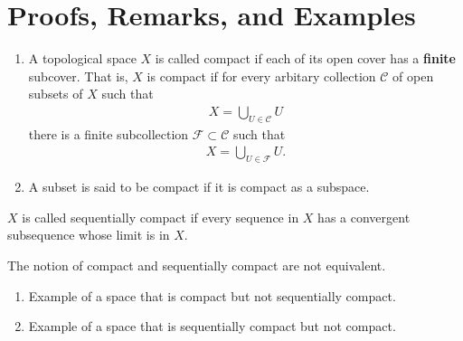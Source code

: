 \section{Proofs, Remarks, and Examples}

\begin{defbox}
    \begin{definition}
        \begin{enumerate}
            \item A topological space \(X\) is called {\color{maththen}compact} if each of its {\color{mathif}open cover} has a \textbf{finite} {\color{mathif}subcover}. That is, \(X\) is compact if for every arbitary collection \(\mathcal{C}\) of open subsets of \(X\) such that
            \begin{align*}
                X = \bigcup_{U \in \mathcal{C}} U
            \end{align*}
            there is a finite subcollection \(\mathcal{F} \subset \mathcal{C}\) such that
            \begin{align*}
                X = \bigcup_{U \in \mathcal{F}} U \text{.}
            \end{align*}
            \item A subset is said to be compact if it is compact as a subspace.
        \end{enumerate}
    \end{definition}
\end{defbox}

\begin{defbox}
    \begin{definition}
        \(X\) is called {\color{maththen}sequentially compact} if every {\color{mathif}sequence} in \(X\) has a {\color{mathif}convergent subsequence} whose limit is in \(X\).
    \end{definition}
\end{defbox}

\begin{rembox}
    \begin{remark}
        The notion of compact and sequentially compact are not equivalent.
    \end{remark}
\end{rembox}

\begin{exmbox}
    \begin{example}
        \begin{enumerate}
            \item Example of a space that is compact but not sequentially compact.
            \item Example of a space that is sequentially compact but not compact.
        \end{enumerate}
    \end{example}
\end{exmbox}

